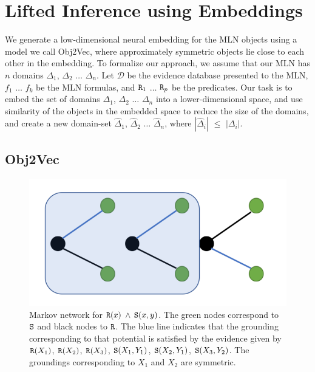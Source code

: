 \section{Lifted Inference using Embeddings}

We generate a low-dimensional neural embedding for the MLN objects using a model we call Obj2Vec, where approximately symmetric objects lie close to each other in the embedding. 
To formalize our approach, we assume that our MLN has $n$ domains $\Delta_1$, $\Delta_2$ $\ldots$ $\Delta_n$.  Let $\mathcal{D}$ be the evidence database presented to the MLN,  $f_1$ $\ldots$ $f_k$ be the MLN formulas, and ${\tt R}_1$ $\ldots$ ${\tt R}_p$ be the predicates. Our task is to embed the set of domains $\Delta_1$, $\Delta_2$ $\ldots$ $\Delta_n$ into a lower-dimensional space, and use similarity of the objects in the embedded space to reduce the size of the domains, and create a new domain-set $\hat{\Delta}_1$, $\hat{\Delta}_2$ $\ldots$ $\hat{\Delta}_n$, where $|\hat{\Delta}_i|$ $\leq$ $|{\Delta}_i|$.
 
 \subsection{Obj2Vec}
\begin{figure} 
\centering
 \includegraphics[scale=0.55]{ex1.pdf}
 \caption{\label{fig:ex1}Markov network for ${\tt R}(x)$ $\wedge$ ${\tt S}(x,y)$. The green nodes correspond to ${\tt S}$ and black nodes to ${\tt R}$. The blue line indicates that the grounding corresponding to that potential is satisfied by the evidence given by ${\tt R}(X_1)$, ${\tt R}(X_2)$, ${\tt R}(X_3)$, ${\tt S}(X_1,Y_1)$, ${\tt S}(X_2,Y_1)$, ${\tt S}(X_3,Y_2)$. The groundings corresponding to $X_1$ and $X_2$ are symmetric.}
 \end{figure}
 
